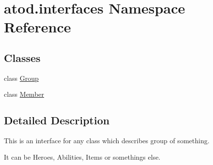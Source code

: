 \hypertarget{namespaceatod_1_1interfaces}{}\section{atod.\+interfaces Namespace Reference}
\label{namespaceatod_1_1interfaces}
\subsection*{Classes}
\begin{DoxyCompactItemize}
\item 
class \hyperlink{classatod_1_1interfaces_1_1_group}{Group}
\item 
class \hyperlink{classatod_1_1interfaces_1_1_member}{Member}
\end{DoxyCompactItemize}


\subsection{Detailed Description}
\begin{DoxyVerb}This is an interface for any class which describes group of something. 

    It can be Heroes, Abilities, Items or somethings else. 
\end{DoxyVerb}
 